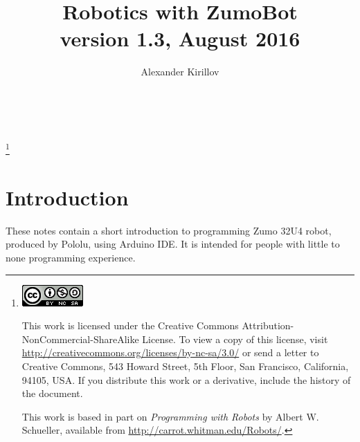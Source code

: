 \documentclass[oneside]{stml-l}
\numberwithin{figure}{chapter}
\begin{document}


\lstMakeShortInline~


\title[Robotics with ZumoBot]{Robotics with ZumoBot\\ {\small version 1.3, August 2016}}
\author{Alexander Kirillov}
\address{IslandBots robotic
club}
\maketitle
\thanks{
\vspace*{2in}
\noindent \centerline{\includegraphics{figures/cc-by-nc-sa.png}}

\noindent This work is licensed under the Creative Commons
Attribution-NonCommercial-ShareAlike License.  To view a copy of this
license, visit \url{http://creativecommons.org/licenses/by-nc-sa/3.0/} or
send a letter to Creative Commons, 543 Howard Street, 5th Floor, San
Francisco, California, 94105, USA. If you distribute this work or a
derivative, include the history of the document.

\vspace{1in}

This work is based in part on {\em Programming with Robots} by
Albert W. Schueller, available from
\url{http://carrot.whitman.edu/Robots/}.
}


\tableofcontents
\chapter*{Introduction}
These notes contain a short introduction to programming Zumo 32U4 robot, produced by Pololu, using
Arduino IDE. It is intended for people with little to none programming experience.
\end{document}
